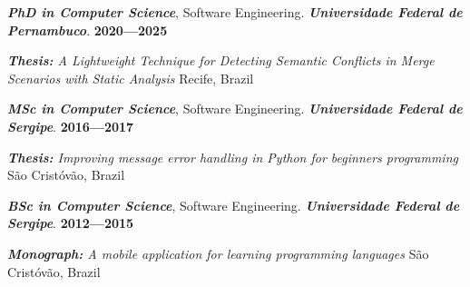 

\textit{\textbf{PhD in Computer Science}}, Software Engineering. \textit{\textbf{Universidade Federal de Pernambuco}}. \hfill\textbf{2020---2025} \par
\textit{\textbf{Thesis:} A Lightweight Technique for Detecting Semantic Conflicts in Merge Scenarios with Static Analysis} \hfill{Recife, Brazil} \par

\textit{\textbf{MSc in Computer Science}}, Software Engineering.  \textit{\textbf{Universidade Federal de Sergipe}}. \hfill\textbf{2016---2017} \par
\textit{\textbf{Thesis:} Improving message error handling in Python for beginners programming} \hfill{São Cristóvão, Brazil} \par

\textit{\textbf{BSc in Computer Science}}, Software Engineering. \textit{\textbf{Universidade Federal de Sergipe}}. \hfill\textbf{2012---2015} \par
\textit{\textbf{Monograph:} A mobile application for learning programming languages} \hfill{São Cristóvão, Brazil} \par